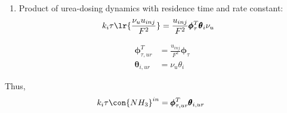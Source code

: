 \begin{enumerate}
        \item Product of urea-dosing dynamics with residence time and rate constant:
        \begin{align*}
        k_{i} \tau \lr{\frac{\nu_u u_{inj}}{F^2}} &= \frac{u_{inj}}{F^2} \pmb \phi_\tau^T \pmb \theta_i \nu_u
        \end{align*}


        \begin{align}
        \pmb\phi_{\tau,ur}^T &= \frac{u_{inj}}{F^2}  \pmb \phi_\tau \\
        \pmb \theta_{i,ur}  &= \nu_u \theta_i
        \end{align}
\end{enumerate}
Thus,
\begin{align}
        k_i \tau \con{NH_3}^{in} &= \pmb \phi_{\tau, ur}^T \pmb \theta_{i, ur}   \label{eqn::k_tau_urea}
\end{align}
